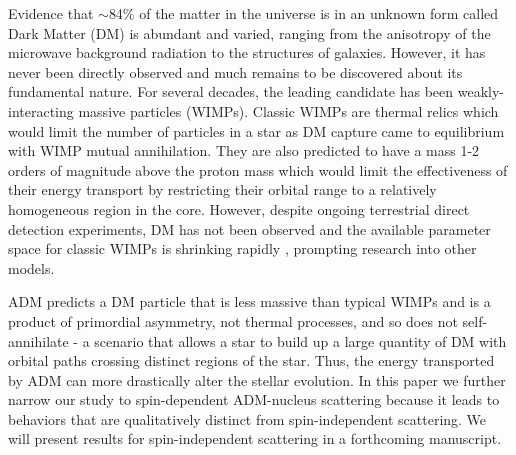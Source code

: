 \documentclass[useAMS,usenatbib]{mnras}
\begin{document}
  Evidence that $\sim$84\% of the matter in the universe is in an unknown form called Dark Matter (DM)  is abundant and varied, ranging from the anisotropy of the microwave background radiation to the structures of galaxies. However, it has never been directly observed and much remains to be discovered about its fundamental nature. For several decades, the leading candidate has been weakly-interacting massive particles (WIMPs). Classic WIMPs are thermal relics which would limit the number of particles in a star as DM capture came to equilibrium with WIMP mutual annihilation. They are also predicted to have a mass 1-2 orders of magnitude above the proton mass which would limit the effectiveness of their energy transport by restricting their orbital range to a relatively homogeneous region in the core. However, despite ongoing terrestrial direct detection experiments, DM has not been observed and the available parameter space for classic WIMPs is shrinking rapidly \citep{Amole16}, prompting research into other models.

  ADM predicts a DM particle that is less massive than typical WIMPs and is a product of primordial asymmetry, not thermal processes, and so does not self-annihilate  - a scenario that allows a star to build up a large quantity of DM with orbital paths crossing distinct regions of the star. Thus, the energy transported by ADM can more drastically alter the stellar evolution. In this paper we further narrow our study to spin-dependent ADM-nucleus scattering because it leads to behaviors that are qualitatively distinct from spin-independent scattering. We will present results for spin-independent scattering in a forthcoming manuscript.
\end{document}
